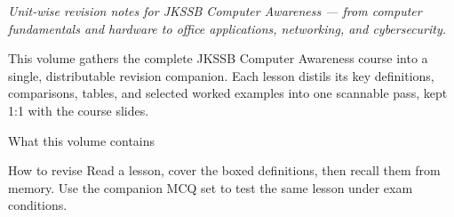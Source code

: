 \documentclass[11pt,a4paper,oneside]{report}
\begin{document}
{}


\noindent\emph{Unit-wise revision notes for JKSSB Computer Awareness --- from
computer fundamentals and hardware to office applications, networking, and
cybersecurity.}

\bigskip
This volume gathers the complete JKSSB Computer Awareness course into a single,
distributable revision companion. Each lesson distils its key definitions,
comparisons, tables, and selected worked examples into one scannable pass, kept
1:1 with the course slides.

\vspace{0.6em}
\begin{fmbox}{What this volume contains}
\end{fmbox}

\vspace{0.7em}
\begin{goldbox}{How to revise}
Read a lesson, cover the boxed definitions, then recall them from memory. Use the
companion MCQ set to test the same lesson under exam conditions.
\end{goldbox}

\clearpage

\clearpage

\begingroup
\setlength{\parskip}{0pt}
\tableofcontents
\endgroup
\clearpage



\end{document}

